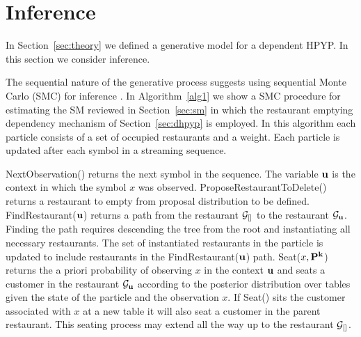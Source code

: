 \section{Inference}
\label{inference}

In Section~\ref{sec:theory} we defined a generative model for a dependent HPYP. In this section we consider inference.

The sequential nature of the generative process suggests using sequential Monte Carlo (SMC) for inference \cite{Doucet2001}.  In Algorithm~\ref{alg1} we show a SMC procedure for estimating the SM reviewed in Section~\ref{sec:sm} in which the restaurant emptying dependency mechanism of Section~\ref{sec:dhpyp} is employed.  In this algorithm each particle consists of a set of occupied restaurants and a weight.  Each particle is updated after each symbol in a streaming sequence.

NextObservation() returns the next symbol in the sequence.  The variable $\bf{u}$ is the context in which the symbol $x$ was observed.  ProposeRestaurantToDelete() returns a restaurant to empty from proposal distribution to be defined. FindRestaurant($\bf{u}$) returns a path from the restaurant $\G_{[]}$ to the restaurant $\G_{\bf{u}}$.  Finding the path requires descending the tree from the root and instantiating all necessary restaurants.  The set of instantiated restaurants in the particle is updated to include restaurants in the FindRestaurant($\bf{u}$) path. Seat($x,\bf{P}^k$) returns the a priori probability of observing $x$ in the context $\bf{u}$ and seats a customer in the restaurant $\G_{\bf{u}}$ according to the posterior distribution over tables given the state of the particle and the observation $x$.  If Seat() sits the customer associated with $x$ at a new table it will also seat a customer in the parent restaurant.  This seating process may extend all the way up to the restaurant $\G_{[]}$.



